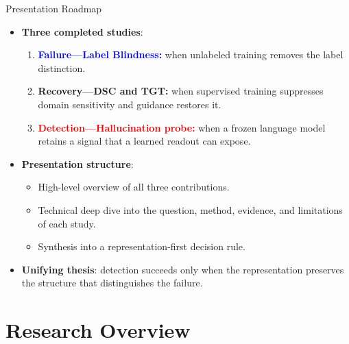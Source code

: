 \documentclass[aspectratio=1610]{beamer}
\begin{document}
\begin{frame}{Presentation Roadmap}
\begin{itemize}
  \item \textbf{Three completed studies}:
  \begin{enumerate}
    \item \textcolor{blue}{\textbf{Failure---Label Blindness:}} when unlabeled training removes the label distinction.
    \item \textcolor{green!60!black}{\textbf{Recovery---DSC and TGT:}} when supervised training suppresses domain sensitivity and guidance restores it.
    \item \textcolor{red}{\textbf{Detection---Hallucination probe:}} when a frozen language model retains a signal that a learned readout can expose.
  \end{enumerate}
  \item \textbf{Presentation structure}:
  \begin{itemize}
    \item High-level overview of all three contributions.
    \item Technical deep dive into the question, method, evidence, and limitations of each study.
    \item Synthesis into a representation-first decision rule.
  \end{itemize}
  \item \textbf{Unifying thesis}: detection succeeds only when the representation preserves the structure that distinguishes the failure.
\end{itemize}
\end{frame}


\section{Research Overview}
\end{document}
